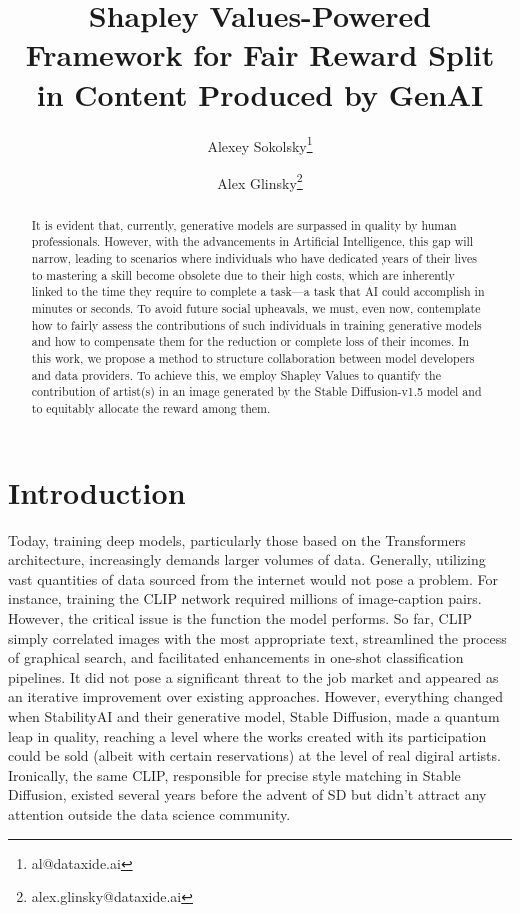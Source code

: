 \documentclass[12pt, letterpaper]{article}
\title{Shapley Values-Powered Framework for Fair Reward Split in Content Produced by GenAI}
\author[1]{Alexey Sokolsky\thanks{al@dataxide.ai}}
\author[1]{Alex Glinsky\thanks{alex.glinsky@dataxide.ai}}
\affil[1]{Dataxide.ai}
\date{}
\begin{document}
\maketitle

\begin{abstract}
It is evident that, currently, generative models are surpassed in quality by human professionals. However, with the advancements in Artificial Intelligence, this gap will narrow, leading to scenarios where individuals who have dedicated years of their lives to mastering a skill become obsolete due to their high costs, which are inherently linked to the time they require to complete a task—a task that AI could accomplish in minutes or seconds. To avoid future social upheavals, we must, even now, contemplate how to fairly assess the contributions of such individuals in training generative models and how to compensate them for the reduction or complete loss of their incomes. In this work, we propose a method to structure collaboration between model developers and data providers. To achieve this, we employ Shapley Values to quantify the contribution of artist(s) in an image generated by the Stable Diffusion-v1.5 model and to equitably allocate the reward among them.
\end{abstract}

\section{Introduction}
Today, training deep models, particularly those based on the Transformers \cite{vaswani2023attention} architecture, increasingly demands larger volumes of data. Generally, utilizing vast quantities of data sourced from the internet would not pose a problem. For instance, training the CLIP network required millions of image-caption pairs. However, the critical issue is the function the model performs. So far, CLIP simply correlated images with the most appropriate text, streamlined the process of graphical search, and facilitated enhancements in one-shot classification pipelines. It did not pose a significant threat to the job market and appeared as an iterative improvement over existing approaches. However, everything changed when StabilityAI and their generative model, Stable Diffusion, made a quantum leap in quality, reaching a level where the works created with its participation could be sold (albeit with certain reservations) at the level of real digiral artists. Ironically, the same CLIP, responsible for precise style matching in Stable Diffusion, existed several years before the advent of SD but didn't attract any attention outside the data science community.
\end{document}
